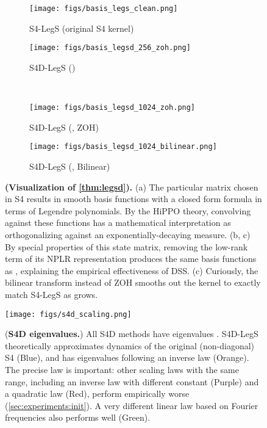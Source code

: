 \documentclass{article}
\begin{document}
\begin{figure}[!t]
  \centering
\begin{subfigure}{.48\linewidth}\centering
  \texttt{[image: figs/basis\_legs\_clean.png]}
  \caption{S4-LegS (original S4 kernel)}
  \label{fig:basis-legs}
\end{subfigure}
\begin{subfigure}{.48\linewidth}\centering
  \texttt{[image: figs/basis\_legsd\_256\_zoh.png]}
  \caption{S4D-LegS ()}
  \label{fig:basis-legsd-256}
\end{subfigure}
\\
\begin{subfigure}{.48\linewidth}\centering
  \texttt{[image: figs/basis\_legsd\_1024\_zoh.png]}
  \caption{S4D-LegS (, ZOH)}
  \label{fig:basis-legsd-1024-zoh}
\end{subfigure}
\begin{subfigure}{.48\linewidth}\centering
  \texttt{[image: figs/basis\_legsd\_1024\_bilinear.png]}
  \caption{S4D-LegS (, Bilinear)}
  \label{fig:basis-legsd-1024-bilinear}
\end{subfigure}
\caption{
  \textbf{(Visualization of \cref{thm:legsd}).}
  (a) The particular  matrix chosen in S4 results in smooth basis functions  with a closed form formula in terms of Legendre polynomials. By the HiPPO theory, convolving against these functions has a mathematical interpretation as orthogonalizing against an exponentially-decaying measure.
  (b, c) By special properties of this state matrix, removing the low-rank term of its NPLR representation produces the same basis functions as , explaining the empirical effectiveness of DSS.
  (c) Curiously, the bilinear transform instead of ZOH smooths out the kernel to exactly match S4-LegS as  grows.
}
\label{fig:basis-legsd}
\end{figure}

\begin{SCfigure}[50][t]
  \texttt{[image: figs/s4d\_scaling.png]}
  \caption{
    (\textbf{S4D eigenvalues.}) All S4D methods have eigenvalues . S4D-LegS theoretically approximates dynamics of the original (non-diagonal) S4 (Blue), and has eigenvalues following an inverse law  (Orange). The precise law is important: other scaling laws with the same range, including an inverse law with different constant (Purple) and a quadratic law (Red), perform empirically worse (\cref{sec:experiments:init}). A very different linear law based on Fourier frequencies also performs well (Green).
  }
  \label{fig:s4d-scaling}
  \vspace*{-1em}
\end{SCfigure}
\end{document}

